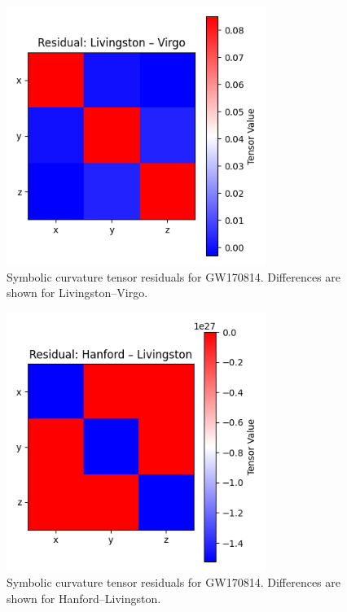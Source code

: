 \documentclass[11pt]{article}
\begin{document}
	\begin{figure}[H]
		\centering
		\includegraphics[width=0.75\textwidth]{GW170814_Livingston_Virgo_residual.png}
		\caption{Symbolic curvature tensor residuals for GW170814. Differences are shown for Livingston–Virgo.}
		\label{fig:GW170814_Livingston_Virgo_Residuals}
	\end{figure}
	
	\begin{figure}[H]
		\centering
		\includegraphics[width=0.75\textwidth]{GW170817_Hanford_Livingston_residual.png}
		\caption{Symbolic curvature tensor residuals for GW170814. Differences are shown for Hanford–Livingston.}
		\label{fig:GW170817_Hanford_Livingston_Residuals}
	\end{figure}
	
\end{document}
